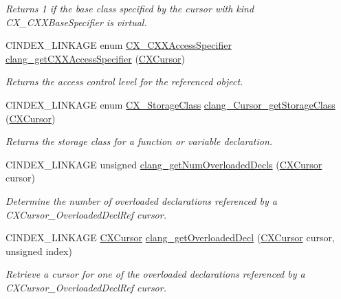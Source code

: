 \begin{DoxyCompactItemize}
\begin{DoxyCompactList}\small\item\em Returns 1 if the base class specified by the cursor with kind C\+X\+\_\+\+C\+X\+X\+Base\+Specifier is virtual. \end{DoxyCompactList}\item 
C\+I\+N\+D\+E\+X\+\_\+\+L\+I\+N\+K\+A\+GE enum \mbox{\hyperlink{group__CINDEX__TYPES_ga26763f9b0b167116c047e2ef4f221c5f}{C\+X\+\_\+\+C\+X\+X\+Access\+Specifier}} \mbox{\hyperlink{group__CINDEX__TYPES_gab5a250699f7d0ad95810891c7926f83d}{clang\+\_\+get\+C\+X\+X\+Access\+Specifier}} (\mbox{\hyperlink{structCXCursor}{C\+X\+Cursor}})
\begin{DoxyCompactList}\small\item\em Returns the access control level for the referenced object. \end{DoxyCompactList}\item 
C\+I\+N\+D\+E\+X\+\_\+\+L\+I\+N\+K\+A\+GE enum \mbox{\hyperlink{group__CINDEX__TYPES_ga03a15eaa53465d7f3ce7d88743241d7e}{C\+X\+\_\+\+Storage\+Class}} \mbox{\hyperlink{group__CINDEX__TYPES_ga230c7904f3878469d772f3e464b9c83d}{clang\+\_\+\+Cursor\+\_\+get\+Storage\+Class}} (\mbox{\hyperlink{structCXCursor}{C\+X\+Cursor}})
\begin{DoxyCompactList}\small\item\em Returns the storage class for a function or variable declaration. \end{DoxyCompactList}\item 
C\+I\+N\+D\+E\+X\+\_\+\+L\+I\+N\+K\+A\+GE unsigned \mbox{\hyperlink{group__CINDEX__TYPES_ga6fd1dfa66abaf18574c74a98e12856bc}{clang\+\_\+get\+Num\+Overloaded\+Decls}} (\mbox{\hyperlink{structCXCursor}{C\+X\+Cursor}} cursor)
\begin{DoxyCompactList}\small\item\em Determine the number of overloaded declarations referenced by a {\ttfamily C\+X\+Cursor\+\_\+\+Overloaded\+Decl\+Ref} cursor. \end{DoxyCompactList}\item 
C\+I\+N\+D\+E\+X\+\_\+\+L\+I\+N\+K\+A\+GE \mbox{\hyperlink{structCXCursor}{C\+X\+Cursor}} \mbox{\hyperlink{group__CINDEX__TYPES_gab1c718b939700a6c23adfb9729c9c28f}{clang\+\_\+get\+Overloaded\+Decl}} (\mbox{\hyperlink{structCXCursor}{C\+X\+Cursor}} cursor, unsigned index)
\begin{DoxyCompactList}\small\item\em Retrieve a cursor for one of the overloaded declarations referenced by a {\ttfamily C\+X\+Cursor\+\_\+\+Overloaded\+Decl\+Ref} cursor. \end{DoxyCompactList}\end{DoxyCompactItemize}


